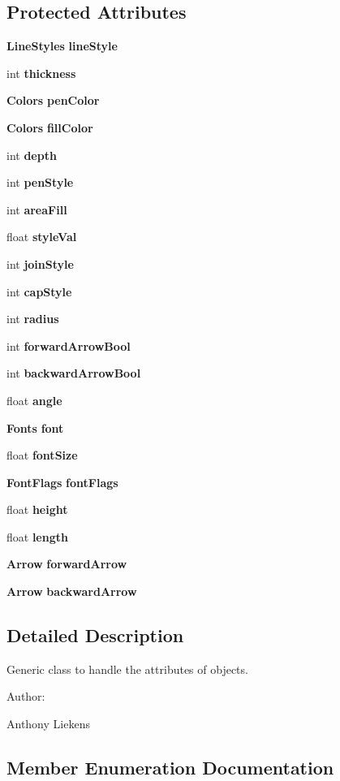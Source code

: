 \subsection*{Protected Attributes}
\begin{CompactItemize}
\item 
{\bf Line\-Styles} {\bf line\-Style}
\item 
int {\bf thickness}
\item 
{\bf Colors} {\bf pen\-Color}
\item 
{\bf Colors} {\bf fill\-Color}
\item 
int {\bf depth}
\item 
int {\bf pen\-Style}
\item 
int {\bf area\-Fill}
\item 
float {\bf style\-Val}
\item 
int {\bf join\-Style}
\item 
int {\bf cap\-Style}
\item 
int {\bf radius}
\item 
int {\bf forward\-Arrow\-Bool}
\item 
int {\bf backward\-Arrow\-Bool}
\item 
float {\bf angle}
\item 
{\bf Fonts} {\bf font}
\item 
float {\bf font\-Size}
\item 
{\bf Font\-Flags} {\bf font\-Flags}
\item 
float {\bf height}
\item 
float {\bf length}
\item 
{\bf Arrow} {\bf forward\-Arrow}
\item 
{\bf Arrow} {\bf backward\-Arrow}
\end{CompactItemize}


\subsection{Detailed Description}
Generic class to handle the attributes of objects. \begin{Desc}
\item[Author: ]\par
Anthony Liekens \end{Desc}




\subsection{Member Enumeration Documentation}
